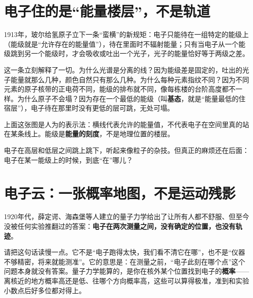 \section{电子住的是“能量楼层”，不是轨道}

1913年，玻尔给氢原子立下一条“蛮横”的新规矩：电子只能待在一组特定的能级上（能级就是“允许存在的能量值”），待在里面时不辐射能量；只有当电子从一个能级跳到另一个能级时，才会吸收或吐出一个光子，光子的能量恰好等于两级之差。

这一条立刻解释了一切。为什么光谱是分离的线？因为能级差是固定的，吐出的光子能量就那么几种，颜色自然只有那么几种。为什么每种元素指纹不同？因为不同元素的原子核带的正电荷不同，能级的排布就不同，像每栋楼的台阶高度都不一样。为什么原子不会塌？因为存在一个最低的能级（叫\textbf{基态}，就是“能量最低的住宿层”），电子待在那里时没有更低的层可跳，无处可塌。


上面这张图是人为的表示法：横线代表允许的能量值，不代表电子在空间里真的站在某条线上。能级是\textbf{能量的刻度}，不是地理位置的楼层。

电子在高层和低层之间跳上跳下，听起来像粒子的杂技。但真正的麻烦还在后面：电子在某一能级上的时候，到底“在”哪儿？

\section{电子云：一张概率地图，不是运动残影}

1920年代，薛定谔、海森堡等人建立的量子力学给出了让所有人都不舒服、但至今没被任何实验推翻过的答案：\textbf{电子在两次测量之间，没有确定的位置，也没有轨迹}。

请把这句话读慢一点。它不是“电子跑得太快，我们看不清它在哪”，也不是“仪器不够精密，将来就能测准”。它的意思是：在测量之前，“电子此刻在哪个点”这个问题本身就没有答案。量子力学能算的，是你在核外某个位置找到电子的\textbf{概率}——离核近的地方概率高还是低、往哪个方向概率高，这些可以算得极准，准到和实验小数点后好多位都对得上。

